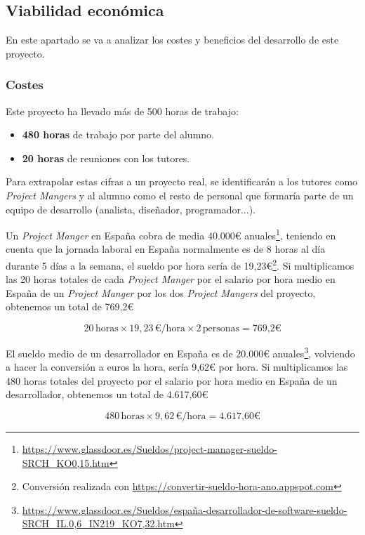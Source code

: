 \subsection{Viabilidad económica}

En este apartado se va a analizar los costes y beneficios del desarrollo de este proyecto.

\subsubsection{Costes}
 
Este proyecto ha llevado más de 500 horas de trabajo:\begin{itemize}
    \item \textbf{480 horas} de trabajo por parte del alumno.
    \item \textbf{20 horas} de reuniones con los tutores.
\end{itemize}  

Para extrapolar estas cifras a un proyecto real, se identificarán a los tutores como \textit{Project Mangers} y al alumno como el resto de personal que formaría parte de un equipo de desarrollo (analista, diseñador, programador...).

Un \textit{Project Manger} en España cobra de media 40.000€ anuales\footnote{\url{https://www.glassdoor.es/Sueldos/project-manager-sueldo-SRCH_KO0,15.htm}}, teniendo en cuenta que la jornada laboral en España normalmente es de 8 horas al día durante 5 días a la semana, el sueldo por hora sería de 19,23€\footnote{Conversión realizada con \url{https://convertir-sueldo-hora-ano.appspot.com}}.
Si multiplicamos las 20 horas totales de cada \textit{Project Manger} por el salario por hora medio en España de un \textit{Project Manger} por los dos \textit{Project Mangers} del proyecto, obtenemos un total de 769,2€

$$20 \, \text{horas} \times 19,23 \, \text{€/hora} \times 2 \, \text{personas} = \text{769,2€}$$

El sueldo medio de un desarrollador en España es de 20.000€ anuales\footnote{\url{https://www.glassdoor.es/Sueldos/españa-desarrollador-de-software-sueldo-SRCH_IL.0,6_IN219_KO7,32.htm}}, volviendo a hacer la conversión a euros la hora, sería 9,62€ por hora.
Si multiplicamos las 480 horas totales del proyecto por el salario por hora medio en España de un desarrollador, obtenemos un total de 4.617,60€

$$480 \, \text{horas} \times 9,62 \, \text{€/hora} = \text{4.617,60€}$$

